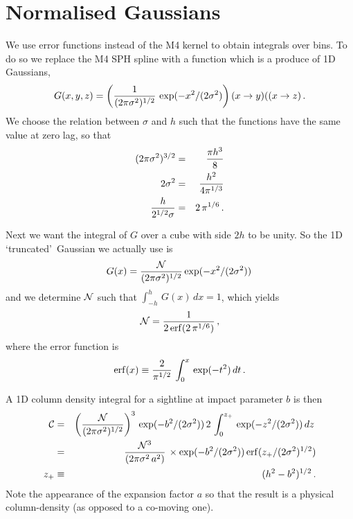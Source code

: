 \documentclass{report}
\begin{document}
\section{Normalised Gaussians}
We use error functions instead of the M4 kernel to obtain integrals over bins. To do so we replace the M4 SPH spline with a function which is a produce of 1D Gaussians,
\begin{equation}
G(x,y,z) = \left({1\over (2\pi \sigma^2)^{1/2}}\,\exp(-x^2/(2\sigma^2)\right)(x\rightarrow y)((x\rightarrow z)\,.
\end{equation}
We choose the relation between $\sigma$ and $h$ such that the functions have the same value at zero lag, so that
\begin{eqnarray}
(2\pi\sigma^2)^{3/2} &=& {\pi h^3\over 8}\nonumber\\
2\sigma^2 &=& {h^2\over 4 \pi^{1/3}}\nonumber\\
{h\over 2^{1/2}\sigma} &=& 2\,\pi^{1/6}\,.
\end{eqnarray}

Next we want the integral of $G$ over a cube with side $2h$ to be unity. So the 1D \lq truncated\rq\ Gaussian we actually use is
\begin{equation}
G(x) = {{\cal N}\over (2\pi \sigma^2)^{1/2}}\exp(-x^2/(2\sigma^2))\,
\end{equation}
and we determine ${\cal N}$ such that $\int_{-h}^{h}\,G(x)\,dx=1$, which yields
\begin{equation}
{\cal N} = {1\over 2\,{\rm erf}(2\,\pi^{1/6})}\,,
\end{equation}
where the error function is
\begin{equation}
{\rm erf}(x) \equiv {2\over \pi^{1/2}}\,\int_0^x\,\exp(-t^2)\,dt\,.
\end{equation}

A 1D column density integral for a sightline at impact parameter $b$ is then
\begin{eqnarray}
{\cal C} &=& \left({{\cal N}\over (2\pi \sigma^2)^{1/2}}\right)^3\,\exp(-b^2/(2\sigma^2))\,2\,\int_0^{z_+}\,\exp(-z^2/(2\sigma^2))\,dz\,\nonumber\\
&=& {{\cal N}^3\over (2\pi\sigma^2\,a^2)}\,\times \exp(-b^2/(2\sigma^2))\,{\rm erf}(z_+/(2\sigma^2)^{1/2})\nonumber\\
z_+ &\equiv & (h^2-b^2)^{1/2}\,.
\end{eqnarray}
Note the appearance of the expansion factor $a$ so that the result is a physical column-density (as opposed to a co-moving one).
\end{document}
